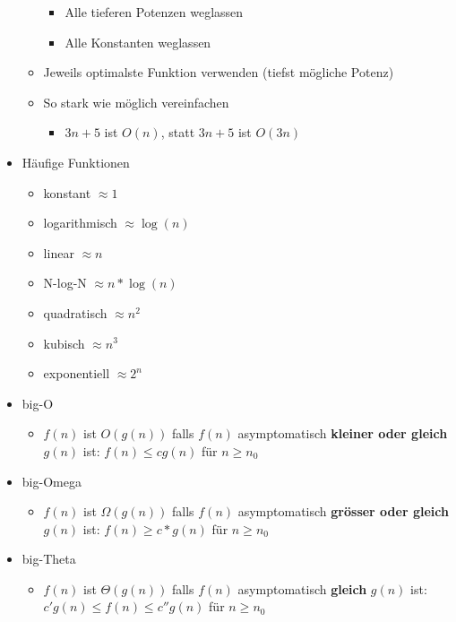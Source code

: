 \documentclass[a4paper, landscape, 8pt]{scrartcl}
\begin{document}
\begin{multicols*}{4}
\begin{itemize}
\begin{itemize}
\begin{itemize}
                            \item Alle tieferen Potenzen weglassen
                            \item Alle Konstanten weglassen
                        \end{itemize}
                        \item Jeweils optimalste Funktion verwenden (tiefst mögliche Potenz)
                        \item So stark wie möglich vereinfachen
                        \begin{itemize}
                            \item $3n + 5$ ist $O(n)$, statt $3n + 5$ ist $O(3n)$
                        \end{itemize}
                    \end{itemize}
                    \item Häufige Funktionen
                    \begin{itemize}
                        \item konstant $\approx 1$
                        \item logarithmisch $\approx \log(n)$
                        \item linear $\approx n$
                        \item N-log-N $\approx n*\log(n)$
                        \item quadratisch $\approx n^2$
                        \item kubisch $\approx n^3$
                        \item exponentiell $\approx 2^n$
                    \end{itemize}
                    \item big-O
                    \begin{itemize}
                        \item $f(n)$ ist $O(g(n))$ falls $f(n)$ asymptomatisch {\bfseries kleiner oder gleich} $g(n)$
                        ist: $f(n) \leq cg(n)$ für $n \geq n_0$
                    \end{itemize}
                    \item big-Omega
                    \begin{itemize}
                        \item $f(n)$ ist $\Omega(g(n))$ falls $f(n)$ asymptomatisch {\bfseries grösser oder gleich}
                        $g(n)$ ist: $f(n) \geq c * g(n)$ für $n \geq n_0$
                    \end{itemize}
                    \item big-Theta
                    \begin{itemize}
                        \item $f(n)$ ist $\Theta(g(n))$ falls $f(n)$ asymptomatisch {\bfseries gleich} $g(n)$ ist:
                        $c'g(n) \leq f(n) \leq c''g(n)$ für $n \geq n_0$
                    \end{itemize}
                \end{itemize}


\end{multicols*}
\end{document}
